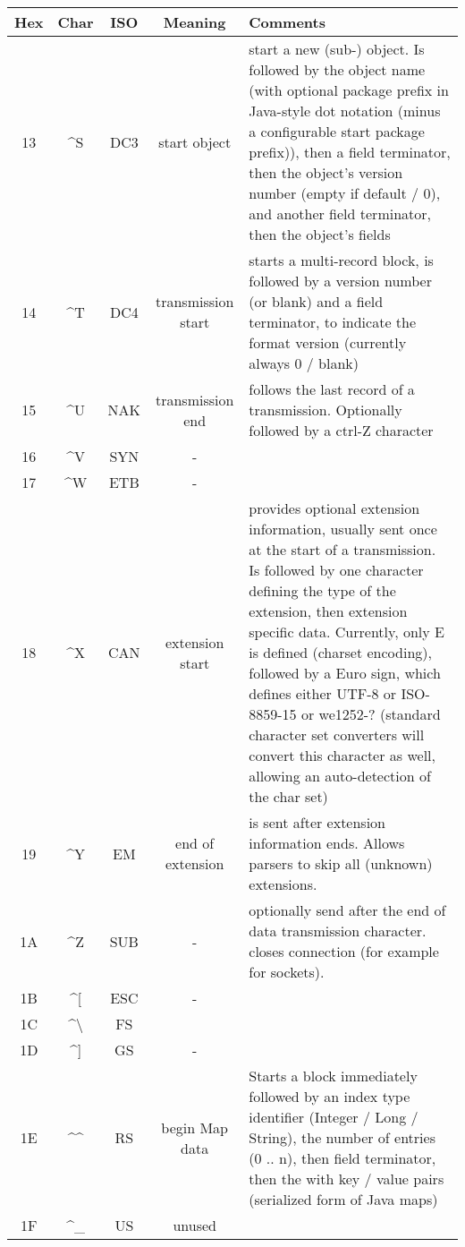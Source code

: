 \documentclass[11pt,a4paper,oneside]{article}
\begin{document}
\begin{tabular}{|c|c|c|c|p{8cm}|}
\hline
Hex & Char & ISO & Meaning & Comments \\
\hline
13 & \textasciicircum S & DC3 & start object       & start a new (sub-) object. Is
followed by the object name (with optional package prefix in Java-style dot notation (minus a
configurable start package prefix)), then a field terminator, then the object's
version number (empty if default / 0), and another field terminator, then the
object's fields \\
14 & \textasciicircum T & DC4 & transmission start & starts a multi-record block, is
followed by a version number (or blank) and a field terminator, to indicate
the format version (currently always 0 / blank) \\
15 & \textasciicircum U & NAK & transmission end   & follows the last record of a
transmission. Optionally followed by a ctrl-Z character \\
16 & \textasciicircum V & SYN &       -            & \\
17 & \textasciicircum W & ETB &      -            & \\
18 & \textasciicircum X & CAN & extension start   & provides optional extension information,
usually sent once at the start of a transmission. Is followed by one character
defining the type of the extension, then extension specific data. Currently,
only E is defined (charset encoding), followed by a Euro sign, which defines
either UTF-8 or ISO-8859-15 or we1252-? (standard character set converters will
convert this character as well, allowing an auto-detection of the char set)\\
19 & \textasciicircum Y & EM & end of extension  & is sent after extension information ends.
Allows parsers to skip all (unknown) extensions. \\
1A & \textasciicircum Z & SUB & - & optionally send after the end of data
transmission character. closes connection (for example for sockets). \\
1B & \textasciicircum [ & ESC &     -            & \\
1C & \textasciicircum \textbackslash & FS &                  & \\
1D & \textasciicircum ] & GS & -& \\
1E & \textasciicircum \textasciicircum & RS & begin Map data & Starts a block immediately followed by an index type identifier
(Integer / Long / String), the number of entries (0 .. n), then field terminator, then the with key / value pairs (serialized
form of Java maps)\\
1F & \textasciicircum \_ &  US & unused         & \\
\hline
\end{tabular}
\end{document}
